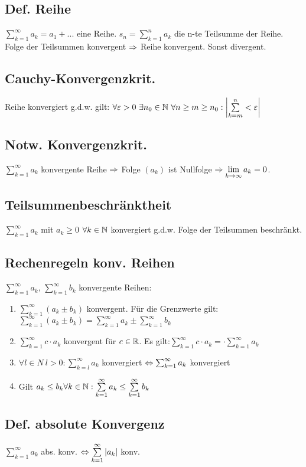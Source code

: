 \subsection*{Def. Reihe}
$\sum\limits_{k = 1}^\infty a_k = a_1 + ...$ eine Reihe. $s_n = \sum\limits_{k = 1}^{n} a_k$ die n-te Teilsumme der Reihe. Folge der Teilsummen konvergent $\Rightarrow$ Reihe konvergent. Sonst divergent.
\subsection*{Cauchy-Konvergenzkrit.}
Reihe konvergiert g.d.w. gilt: $\forall \varepsilon > 0 \ \exists n_0\in \mathbb N \ \forall n \geq m \geq n_0: \left|\sum\limits_{k = m}^{n} < \varepsilon \right|$ 
\subsection*{Notw. Konvergenzkrit.}
$\sum\limits_{k=1}^\infty a_k$ konvergente Reihe $\Rightarrow$ Folge $(a_k)$ ist Nullfolge $\Rightarrow \lim\limits_{k\rightarrow \infty} a_k = 0$.
\subsection*{Teilsummenbeschränktheit}
$\sum\limits_{k=1}^\infty a_k$ mit $a_k \geq 0$ $\forall k \in \mathbb N$ konvergiert g.d.w. Folge der Teilsummen beschränkt.
\subsection*{Rechenregeln konv. Reihen}
$\sum\limits_{k=1}^\infty a_k$, $\sum\limits_{k = 1}^\infty b_k$ konvergente Reihen:
\begin{enumerate}[label=\alph*., noitemsep]
    \item $\sum\limits_{k = 1}^\infty (a_k \pm b_k)$ konvergent. Für die Grenzwerte gilt:$\sum\limits_{k = 1}^\infty (a_k \pm b_k) = \sum_{k = 1}^\infty a_k \pm \sum\limits_{k = 1}^\infty b_k$
    \item $\sum\limits_{k = 1}^\infty c \cdot a_k$ konvergent für $c \in \mathbb R$. Es gilt:$\sum\limits_{k = 1}^\infty c \cdot a_k = \cdot \sum\limits_{k = 1}^\infty a_k$
    \item $\forall l \in N \ l > 0: \sum\limits_{k = l}^\infty a_k$ konvergiert $\Leftrightarrow \sum_{k = 1}^\infty a_k$ konvergiert
    \item Gilt $a_k \leq b_k \forall k \in \mathbb N: \sum\limits_{k = 1}^\infty a_k \leq \sum\limits_{k = 1}^\infty b_k$
\end{enumerate}
\subsection*{Def. absolute Konvergenz}
$\sum\limits_{k = 1}^\infty a_k$ abs. konv. $\Leftrightarrow \sum\limits_{k = 1}^\infty |a_k|$ konv.

